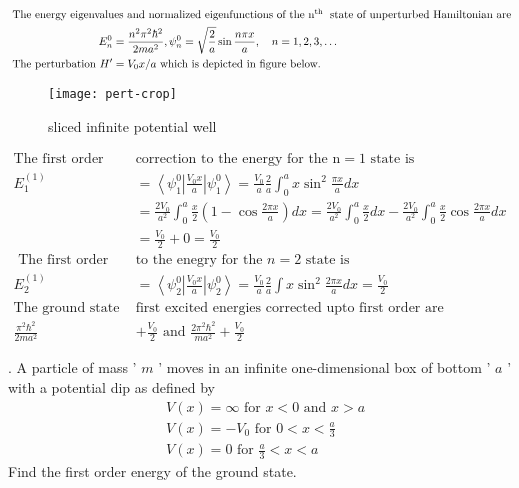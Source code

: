 \begin{answer}
\begin{align*}
\intertext{	The energy eigenvalues and normalized eigenfunctions of the $\mathrm{n}^{\text {th }}$ state of unperturbed Hamiltonian are}
	E_{n}^{0}&=\frac{n^{2} \pi^{2} \hbar^{2}}{2 m a^{2}}, \psi_{n}^{0}=\sqrt{\frac{2}{a}} \sin \frac{n \pi x}{a}, \quad n=1,2,3, \ldots\\
\text{	The perturbation }H^{\prime}&=V_{0} x / a\text{ which is depicted in figure below.}
\end{align*}
	\begin{figure}[H]
		\centering
		\texttt{[image: pert-crop]}
		\caption{sliced infinite potential well}
		\label{}
	\end{figure}
	\begin{align*}
	\text{The first order }&\text{correction to the energy for the $\mathrm{n}=1$ state is}\\
	E_{1}^{(1)}&=\left\langle\psi_{1}^{0}\left|\frac{V_{0} x}{a}\right| \psi_{1}^{0}\right\rangle=\frac{V_{0}}{a} \frac{2}{a} \int_{0}^{a} x \sin ^{2} \frac{\pi x}{a} d x\\
	&=\frac{2 V_{0}}{a^{2}} \int_{0}^{a} \frac{x}{2}\left(1-\cos \frac{2 \pi x}{a}\right) d x=\frac{2 V_{0}}{a^{2}} \int_{0}^{a} \frac{x}{2} d x-\frac{2 V_{0}}{a^{2}} \int_{0}^{a} \frac{x}{2} \cos \frac{2 \pi x}{a} d x \\
	&=\frac{V_{0}}{2}+0=\frac{V_{0}}{2}\\
\text{	The first order correction }&\text{to the enegry for the $n=2$ state is}\\
	E_{2}^{(1)}&=\left\langle\psi_{2}^{0}\left|\frac{V_{0} x}{a}\right| \psi_{2}^{0}\right\rangle=\frac{V_{0}}{a} \frac{2}{a} \int x \sin ^{2} \frac{2 \pi x}{a} d x=\frac{V_{0}}{2}\\
	\text{The ground state and }&\text{first excited energies corrected upto first order are}\\
	\frac{\pi^{2} \hbar^{2}}{2 m a^{2}}&+\frac{V_{0}}{2} \text { and } \frac{2 \pi^{2} \hbar^{2}}{m a^{2}}+\frac{V_{0}}{2}
	\end{align*}
\end{answer}
\begin{exercise}
. A particle of mass ' $m$ ' moves in an infinite one-dimensional box of bottom ' $a$ ' with a potential dip as defined by
	$$
	\begin{aligned}
	&V(x)=\infty \text { for } x<0 \text { and } x>a \\
	&V(x)=-V_{0} \text { for } 0<x<\frac{a}{3} \\
	&V(x)=0 \text { for } \frac{a}{3}<x<a
	\end{aligned}
	$$
	Find the first order energy of the ground state.
\end{exercise}
